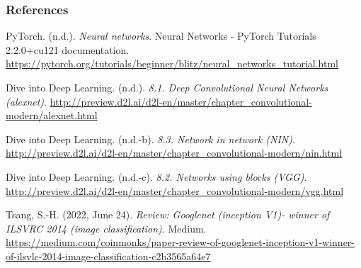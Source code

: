 \begin{vbframe}
\frametitle{References}
\footnotesize{
\begin{thebibliography}{99}

 PyTorch. (n.d.). \textit{Neural networks}. Neural Networks - PyTorch Tutorials 2.2.0+cu121 documentation. \url{https://pytorch.org/tutorials/beginner/blitz/neural_networks_tutorial.html}

 Dive into Deep Learning. (n.d.). \textit{8.1. Deep Convolutional Neural Networks (alexnet)}. \url{http://preview.d2l.ai/d2l-en/master/chapter_convolutional-modern/alexnet.html}

Dive into Deep Learning. (n.d.-b). \textit{8.3. Network in network (NIN)}. \url{http://preview.d2l.ai/d2l-en/master/chapter_convolutional-modern/nin.html}

 Dive into Deep Learning. (n.d.-c). \textit{8.2. Networks using blocks (VGG)}. \url{http://preview.d2l.ai/d2l-en/master/chapter_convolutional-modern/vgg.html}

 Tsang, S.-H. (2022, June 24). \textit{Review: Googlenet (inception V1)- winner of ILSVRC 2014 (image classification)}. Medium. \url{https://medium.com/coinmonks/paper-review-of-googlenet-inception-v1-winner-of-ilsvlc-2014-image-classification-c2b3565a64e7} 


\end{thebibliography}}
\end{vbframe}
